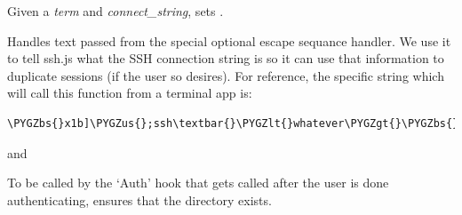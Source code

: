 \documentclass[letterpaper,10pt,openany]{sphinxmanual}
\def\PYGZbs{\char`\\}
\def\PYGZus{\char`\_}
\def\PYGZlt{\char`\<}
\def\PYGZgt{\char`\>}
\begin{document}

\begin{fulllineitems}
\label{Applications/terminal/plugin_ssh:ssh.set_ssh_connect_string}
Given a \emph{term} and \emph{connect\_string}, sets
.

\end{fulllineitems}


\begin{fulllineitems}
\label{Applications/terminal/plugin_ssh:ssh.opt_esc_handler}
Handles text passed from the special optional escape sequance handler.  We
use it to tell ssh.js what the SSH connection string is so it can use that
information to duplicate sessions (if the user so desires).  For reference,
the specific string which will call this function from a terminal app is:

\begin{Verbatim}[commandchars=\\\{\}]
\PYGZbs{}x1b]\PYGZus{};ssh\textbar{}\PYGZlt{}whatever\PYGZgt{}\PYGZbs{}x07
\end{Verbatim}




 and



\end{fulllineitems}


\begin{fulllineitems}
\label{Applications/terminal/plugin_ssh:ssh.create_user_ssh_dir}
To be called by the `Auth' hook that gets called after the user is done
authenticating, ensures that the  directory exists.

\end{fulllineitems}

\end{document}
